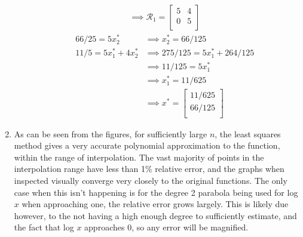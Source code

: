 \documentclass{article}
\begin{document}
\begin{enumerate}
\begin{enumerate}
\begin{align*}
          \implies 
          \mathcal{R}_1 =
          \begin{bmatrix}
              5 & 4 \\
              0 & 5 \\
          \end{bmatrix}
      \end{align*}
      \begin{align*}
          66/25 = 5x^*_2 &\implies x^*_2 = 66/125 \\
          11/5 = 5x^*_1 + 4x^*_2 &\implies 275/125 = 5x^*_1 + 264/125 \\
          &\implies 11/125 = 5x^*_1 \\
          &\implies x^*_1 = 11/625 \\
          &\implies x^* =
          \begin{bmatrix}
            11/625 \\
            66/125 \\
          \end{bmatrix}
      \end{align*}
  \end{enumerate}
  \newpage
  \item As can be seen from the figures, for sufficiently large $n$, the least squares method gives a very accurate polynomial approximation to the function, within the range of interpolation. The vast majority of points in the interpolation range have less than 1\% relative error, and the graphs when inspected visually converge very closely to the original functions. The only case when this isn't happening is for the degree 2 parabola being used for log $x$ when approaching one, the relative error grows largely. This is likely due however, to the not having a high enough degree to sufficiently estimate, and the fact that log $x$ approaches 0, so any error will be magnified.
  

\end{enumerate}
\end{document}
